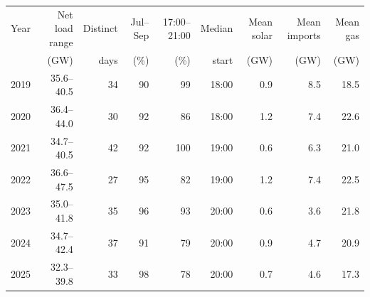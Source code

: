 \begin{tabular}{lrrrrrrrr}
\toprule
Year & Net load range & Distinct & Jul--Sep & 17:00--21:00 & Median & Mean solar & Mean imports & Mean gas \\
 & (GW) & days & (\%) & (\%) & start & (GW) & (GW) & (GW) \\
\midrule
2019 & 35.6--40.5 & 34 & 90 & 99 & 18:00 & 0.9 & 8.5 & 18.5 \\
2020 & 36.4--44.0 & 30 & 92 & 86 & 18:00 & 1.2 & 7.4 & 22.6 \\
2021 & 34.7--40.5 & 42 & 92 & 100 & 19:00 & 0.6 & 6.3 & 21.0 \\
2022 & 36.6--47.5 & 27 & 95 & 82 & 19:00 & 1.2 & 7.4 & 22.5 \\
2023 & 35.0--41.8 & 35 & 96 & 93 & 20:00 & 0.6 & 3.6 & 21.8 \\
2024 & 34.7--42.4 & 37 & 91 & 79 & 20:00 & 0.9 & 4.7 & 20.9 \\
2025 & 32.3--39.8 & 33 & 98 & 78 & 20:00 & 0.7 & 4.6 & 17.3 \\
\bottomrule
\end{tabular}